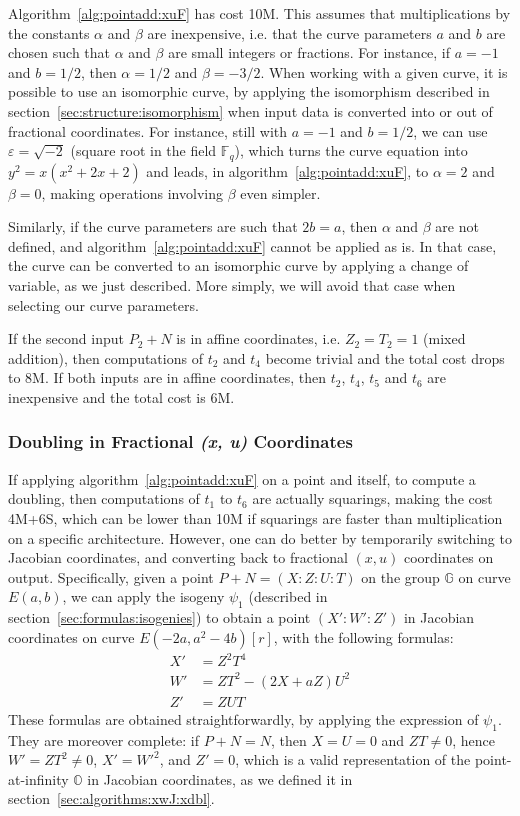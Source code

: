 \documentclass{llncs}
\newcommand{\bF}{\mathbb{F}}
\newcommand{\bG}{\mathbb{G}}
\newcommand{\neutral}{\mathbb{O}}
\begin{document}
Algorithm~\ref{alg:pointadd:xuF} has cost 10M. This assumes that
multiplications by the constants $\alpha$ and $\beta$ are inexpensive,
i.e. that the curve parameters $a$ and $b$ are chosen such that $\alpha$
and $\beta$ are small integers or fractions. For instance, if $a = -1$
and $b = 1/2$, then $\alpha = 1/2$ and $\beta = -3/2$. When working with
a given curve, it is possible to use an isomorphic curve, by applying
the isomorphism described in section~\ref{sec:structure:isomorphism}
when input data is converted into or out of fractional coordinates. For
instance, still with $a = -1$ and $b = 1/2$, we can use $\varepsilon =
\sqrt{-2}$ (square root in the field $\bF_q$), which turns the curve
equation into $y^2 = x(x^2+2x+2)$ and leads, in
algorithm~\ref{alg:pointadd:xuF}, to $\alpha = 2$ and $\beta = 0$,
making operations involving $\beta$ even simpler.

Similarly, if the curve parameters are such that $2b = a$, then $\alpha$
and $\beta$ are not defined, and algorithm~\ref{alg:pointadd:xuF} cannot
be applied as is. In that case, the curve can be converted to an
isomorphic curve by applying a change of variable, as we just described.
More simply, we will avoid that case when selecting our curve parameters.

If the second input $P_2+N$ is in affine coordinates, i.e. $Z_2 = T_2 = 1$
(mixed addition), then computations of $t_2$ and $t_4$ become trivial and
the total cost drops to 8M. If both inputs are in affine coordinates, then
$t_2$, $t_4$, $t_5$ and $t_6$ are inexpensive and the total cost is 6M.

\subsubsection{Doubling in Fractional \emph{(x, u)} Coordinates}\label{sec:algorithms:xuF:dbl}

If applying algorithm~\ref{alg:pointadd:xuF} on a point and itself, to
compute a doubling, then computations of $t_1$ to $t_6$ are actually
squarings, making the cost 4M+6S, which can be lower than 10M if
squarings are faster than multiplication on a specific architecture.
However, one can do better by temporarily switching to Jacobian
coordinates, and converting back to fractional $(x,u)$ coordinates on
output. Specifically, given a point $P+N = (X{:}Z{:}U{:}T)$ on the group
$\bG$ on curve $E(a,b)$, we can apply the isogeny $\psi_1$ (described in
section~\ref{sec:formulas:isogenies}) to obtain a point $(X'{:}W'{:}Z')$
in Jacobian coordinates on curve $E(-2a, a^2-4b)[r]$, with the following
formulas:
\begin{align*}
    X' &= Z^2T^4 \\
    W' &= ZT^2 - (2X + aZ)U^2 \\
    Z' &= ZUT
\end{align*}
These formulas are obtained straightforwardly, by applying the
expression of $\psi_1$. They are moreover complete: if $P+N = N$, then
$X = U = 0$ and $ZT \neq 0$, hence $W' = ZT^2 \neq 0$, $X' = W'^2$,
and $Z' = 0$, which is a valid representation of the point-at-infinity
$\neutral$ in Jacobian coordinates, as we defined it in section~\ref{sec:algorithms:xwJ:xdbl}.
\end{document}
